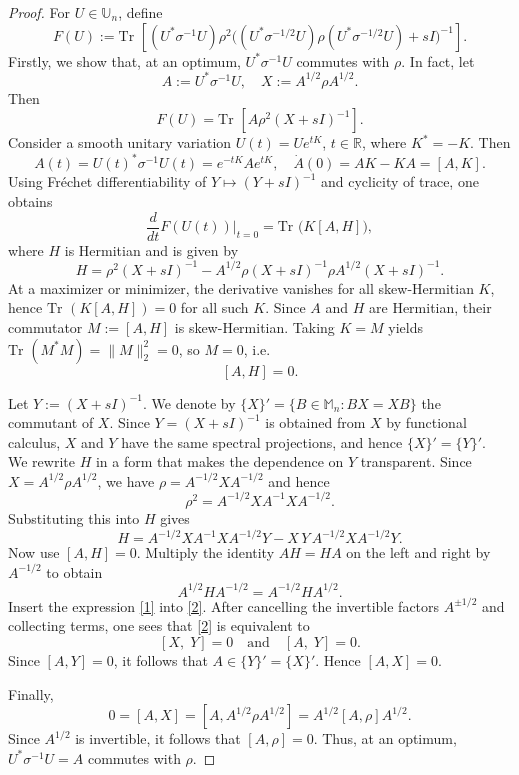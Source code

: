 \documentclass[10pt,reqno]{amsart}
\theoremstyle{break-italic}
\theoremstyle{break-italic}
\theoremstyle{break-italic}
\theoremstyle{break-italic}
\theoremstyle{break-italic}
\theoremstyle{break-italic}
\theoremstyle{break-italic}
\theoremstyle{break-italic}
\theoremstyle{break-roman}
\theoremstyle{standard}
\theoremstyle{varthm-roman}
\theoremstyle{varthm-italic}
\theoremstyle{varthm-roman-break}
\theoremstyle{varthm-italic-break}
\theoremstyle{varthm-roman-no-punctuation}
\theoremstyle{varthm-italic-no-punctuation}
\numberwithin{equation}{section}
\def\Tr{\text{Tr }}
\begin{document}
\begin{proof} For $U\in\mathbb U_n$, define 
$$
F(U)
:=\Tr\!\left[
(U^*\sigma^{-1}U)\rho^2
\Big((U^*\sigma^{-1/2}U)\rho(U^*\sigma^{-1/2}U)+sI\Big)^{-1}
\right].
$$
Firstly, we show that, at an optimum, $U^*\sigma^{-1}U$ commutes with $\rho$. In fact, let
$$
A:=U^*\sigma^{-1}U,\quad X:=A^{1/2}\rho A^{1/2}.
$$
Then
$$
F(U)=\Tr\!\left[A\rho^2(X+sI)^{-1}\right].
$$
Consider a smooth unitary variation $U(t)=Ue^{tK}$, $t\in\mathbb R$, where $K^*=-K$.  
Then
$$
A(t)=U(t)^*\sigma^{-1}U(t)=e^{-tK}Ae^{tK},
\quad
\dot A(0)=AK-KA=[A,K].
$$
Using Fr\'echet differentiability of $Y\mapsto (Y+sI)^{-1}$ and cyclicity of trace,
one obtains
$$
\dfrac{d}{dt}F(U(t))\Big\lvert_{t=0}
=\Tr\!\big(K[A,H]\big),
$$
where $H$ is Hermitian and is given by
\[
H=\rho^2(X+sI)^{-1}-A^{1/2}\rho(X+sI)^{-1}\rho A^{1/2}(X+sI)^{-1}.
\]
At a maximizer or minimizer, the derivative vanishes for all skew-Hermitian $K$,
hence $\Tr(K[A,H])=0$ for all such $K$. Since $A$ and $H$ are Hermitian, their
commutator $M:=[A,H]$ is skew-Hermitian. Taking $K=M$ yields
\(
\Tr(M^*M)=\|M\|_2^2=0
\),
so $M=0$, i.e.
\[
[A,H]=0.
\]

Let $Y:=(X+sI)^{-1}.$ We denote by $\{X\}'=\{B\in\mathbb M_n: BX=XB\}$ the commutant of $X$.
Since $Y=(X+sI)^{-1}$ is obtained from $X$ by functional calculus, $X$ and $Y$
have the same spectral projections, and hence $\{X\}'=\{Y\}'$.\\
We rewrite $H$ in a form that makes the dependence on $Y$ transparent.
Since $X=A^{1/2}\rho A^{1/2}$, we have $\rho=A^{-1/2}XA^{-1/2}$ and hence
\[
\rho^2=A^{-1/2}XA^{-1}XA^{-1/2}.
\]
Substituting this into $H$ gives
\begin{equation}\label{1}
H
=
A^{-1/2}XA^{-1}XA^{-1/2}Y
-
X\,Y\,A^{-1/2}X A^{-1/2}Y.
\end{equation}
Now use $[A,H]=0$. Multiply the identity $AH=HA$ on the left and right by $A^{-1/2}$
to obtain
\begin{equation}\label{2}
A^{1/2}HA^{-1/2}=A^{-1/2}HA^{1/2}.
\end{equation}
Insert the expression \eqref{1} into \eqref{2}. After cancelling the invertible
factors $A^{\pm 1/2}$ and collecting terms, one sees that \eqref{2} is equivalent to
\[
[X,\;Y]=0
\quad\text{and}\quad
[A,\;Y]=0.
\]
Since $[A,Y]=0$, it follows that $A\in\{Y\}'=\{X\}'$.  Hence $[A,X]=0$.

Finally,
\[
0=[A,X]=[A,A^{1/2}\rho A^{1/2}]
=A^{1/2}[A,\rho]A^{1/2}.
\]
Since $A^{1/2}$ is invertible, it follows that $[A,\rho]=0$. 
Thus, at an optimum, $U^*\sigma^{-1}U=A$ commutes with $\rho$.



\end{proof}
\end{document}
